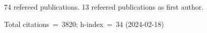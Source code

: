 74 refereed publications. 13 refeered publications as first author.

Total citations~=~3820; h-index~=~34 (2024-02-18)